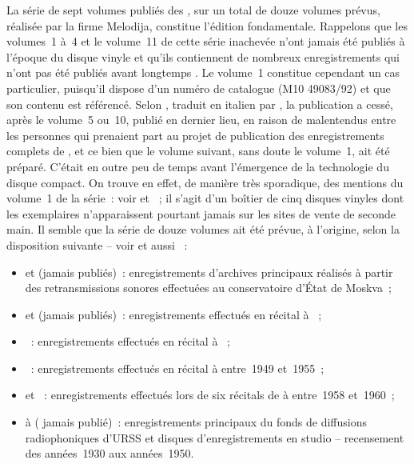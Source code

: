 La série de sept volumes publiés des , sur
un total de douze volumes prévus, réalisée par la firme Melodija, constitue
l'édition fondamentale.
Rappelons que les volumes~1 à~4 et le volume~11 de cette série inachevée
n'ont jamais été publiés à l'époque du disque vinyle et qu'ils contiennent
de nombreux enregistrements qui n'ont pas été publiés avant longtemps
\citep[voir][p.~64]{Malik}.
Le volume~1 constitue cependant un cas particulier, puisqu'il dispose d'un
numéro de catalogue (M10 49083/92) et que son contenu est référencé.
Selon \INikonovich{} \citep[voir][p.~11]{Nikonovich11}, traduit en italien
par \ARossi{} \citep[voir][]{Rossi}, la publication a cessé, après le
volume~5 ou~10, publié en dernier lieu, en raison de malentendus entre les
personnes qui prenaient part au projet de publication des enregistrements
complets de \VSofronitsky{}, et ce bien que le volume suivant, sans doute le
volume~1, ait été préparé.
C'était en outre peu de temps avant l'émergence de la technologie du disque
compact.
On trouve en effet, de manière très sporadique, des mentions du volume~1 de
la série~: voir \citet{Recordssu} et \citet{Rockdisco}~; il s'agit d'un
boîtier de cinq disques vinyles dont les exemplaires n'apparaissent pourtant
jamais sur les sites de vente de seconde main.
Il semble que la série de douze volumes ait été prévue, à l'origine, selon
la disposition suivante -- voir \citet[message de densen2002 daté 2006-09-26
à~21~29]{Forumklassika.ru} et aussi \citet[p.~94-107]{White}~:
\begin{itemize}
 \item {} et  (jamais publiés)~:
 enregistrements d'archives principaux réalisés à partir des retransmissions
 sonores effectuées au conservatoire d'\hbox{État} de Moskva~;
 \item {} et  (jamais publiés)~:
 enregistrements effectués en récital à \MSHM~;
 \item {}~:
 enregistrements effectués en récital à \LPGH~;
 \item {}~:
 enregistrements effectués en récital à \Moscow entre~1949 et~1955~;
 \item {} et ~:
 enregistrements effectués lors de six récitals de \VSofronitsky{} à \MCSH
 entre~1958 et~1960~;
 \item {} à  ( jamais publié)~:
 enregistrements principaux du fonds de diffusions radiophoniques d'URSS et
 disques d'enregistrements en studio -- recensement des années~1930 aux
 années~1950.
\end{itemize}

